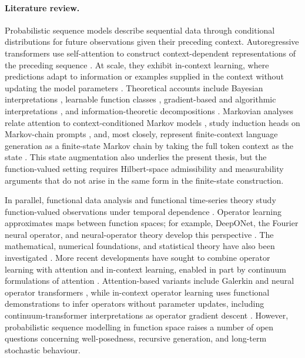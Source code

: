\paragraph{Literature review.}
Probabilistic sequence models describe sequential data through conditional distributions for future observations given their preceding context. Autoregressive transformers use self-attention to construct context-dependent representations of the preceding sequence \cite{VaswaniEtAl2017}. At scale, they exhibit in-context learning, where predictions adapt to information or examples supplied in the context without updating the model parameters \cite{BrownEtAl2020}. Theoretical accounts include Bayesian interpretations \cite{XieEtAl2022}, learnable function classes \cite{GargEtAl2022,AkyurekEtAl2023}, gradient-based and algorithmic interpretations \cite{VonOswaldEtAl2023,LiEtAl2023ICL,ChengEtAl2024}, and information-theoretic decompositions \cite{JeonEtAl2024}. Markovian analyses relate attention to context-conditioned Markov models \cite{IldizEtAl2024}, study induction heads on Markov-chain prompts \cite{EdelmanEtAl2024}, and, most closely, represent finite-context language generation as a finite-state Markov chain by taking the full token context as the state \cite{ZekriEtAl2025}. This state augmentation also underlies the present thesis, but the function-valued setting requires Hilbert-space admissibility and measurability arguments that do not arise in the same form in the finite-state construction.

In parallel, functional data analysis and functional time-series theory study function-valued observations under temporal dependence \cite{RamsaySilverman2005,Bosq2000,HormannKokoszka2010,AueEtAl2015}. Operator learning approximates maps between function spaces; for example, DeepONet, the Fourier neural operator, and neural-operator theory develop this perspective \cite{LuEtAl2021,LiEtAl2021FNO,KovachkiEtAl2023}. The mathematical, numerical foundations, and statistical theory have also been investigated \cite{BoulleTownsend2024,ReinhardtEtAl2026}. More recent developments have sought to combine operator learning with attention and in-context learning, enabled in part by continuum formulations of attention \cite{CalvelloEtAl2025}. Attention-based variants include Galerkin and neural operator transformers \cite{Cao2021,HaoEtAl2023}, while in-context operator learning uses functional demonstrations to infer operators without parameter updates, including continuum-transformer interpretations as operator gradient descent \cite{YangEtAl2023ICON,YangOsher2024,MishraEtAl2026}. However, probabilistic sequence modelling in function space raises a number of open questions concerning well-posedness, recursive generation, and long-term stochastic behaviour.

